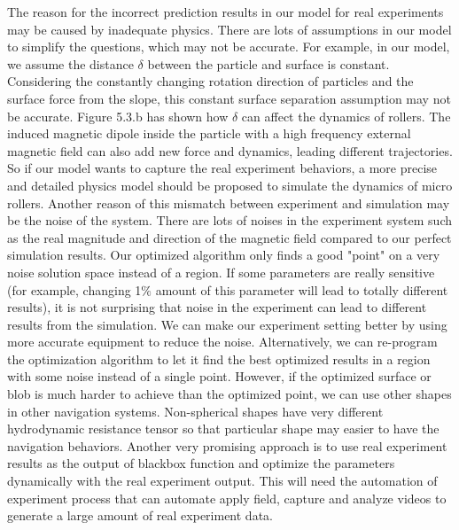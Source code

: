  The reason for the incorrect prediction results in our model for real experiments may be caused by inadequate physics. There are lots of assumptions in our model to simplify the questions, which may not be accurate. For example, in our model,  we assume the distance $\delta$ between the particle and surface is constant. Considering the constantly changing rotation direction of particles and the surface force from the slope, this constant surface separation assumption may not be accurate. Figure 5.3.b has shown how $\delta$ can affect the dynamics of rollers. The induced magnetic dipole inside the particle with a high frequency external magnetic field can also add new force and dynamics, leading different trajectories.
 So if our model wants to capture the real experiment behaviors, a more precise and detailed physics model should be proposed to  simulate the dynamics of micro rollers. Another reason of this mismatch between experiment and simulation may be the noise of the system. There are lots of noises in the experiment system  such as the real magnitude and direction of the magnetic field compared to our perfect simulation results. Our optimized algorithm only finds a good  "point" on a very noise solution space instead of a region. If some parameters are really sensitive (for example, changing 1$\%$ amount of this parameter will lead to totally different results), it is not surprising that noise in the experiment can lead to different results from the simulation. We can make our experiment setting better by using more accurate equipment to reduce the noise. Alternatively, we can re-program the optimization algorithm to let it find the best optimized results in a region with some noise instead of a single point. However, if the optimized  surface or blob is much harder to achieve than the optimized point, we can use other shapes in other navigation systems. Non-spherical shapes have very different hydrodynamic resistance tensor\autocite{brooks2018shape} so that particular shape may easier to have the navigation behaviors. Another very promising approach is to use real experiment results as the output of blackbox function and optimize the parameters dynamically with the real experiment output. This will need the automation of experiment process that can automate apply field, capture and analyze  videos to generate a large amount of real experiment data\autocite{oulmas20183d}.

